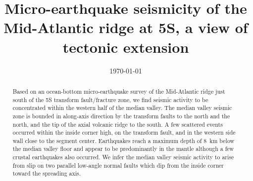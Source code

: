 \documentclass[jgr]{agu2001}
\newlength{\tw}
\begin{document}
\title{Micro-earthquake seismicity of the Mid-Atlantic ridge at
 5\dg S, a view of tectonic extension}
\date{\today}

\begin{abstract}
Based on an  ocean-bottom micro-earthquake survey of the
Mid-Atlantic ridge just south of the 5\dg S transform fault/fracture
zone, we find seismic activity to be concentrated within the western
half of the median valley.  The median valley seismic zone is bounded
in along-axis direction by the transform faults to the north and the
north, and the tip of the axial volcanic ridge to the south.  A few
scattered events occurred within the inside corner high, on the
transform fault, and in the western side wall close to the segment
center. Earthquakes reach a maximum depth of 8~km below the median
valley floor and appear to be predominantly in the mantle although a
few crustal earthquakes also occurred.  We infer the median valley
seismic activity to arise from slip on two parallel low-angle normal
faults which dip from the inside corner toward the spreading axis.
\end{abstract}
\end{document}

